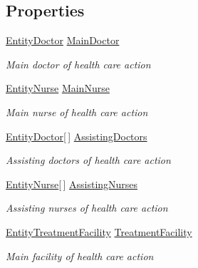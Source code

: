 \subsection*{Properties}
\begin{DoxyCompactItemize}
\item 
\hyperlink{class_general_health_care_elements_1_1_entities_1_1_entity_doctor}{Entity\+Doctor} \hyperlink{class_general_health_care_elements_1_1_resource_handling_1_1_resource_set_a867a08615f6caa7f2c7c96ef216a8098}{Main\+Doctor}
\begin{DoxyCompactList}\small\item\em Main doctor of health care action \end{DoxyCompactList}\item 
\hyperlink{class_general_health_care_elements_1_1_entities_1_1_entity_nurse}{Entity\+Nurse} \hyperlink{class_general_health_care_elements_1_1_resource_handling_1_1_resource_set_a6fbeb8cff94dcf758d47676b78e917dd}{Main\+Nurse}
\begin{DoxyCompactList}\small\item\em Main nurse of health care action \end{DoxyCompactList}\item 
\hyperlink{class_general_health_care_elements_1_1_entities_1_1_entity_doctor}{Entity\+Doctor}\mbox{[}$\,$\mbox{]} \hyperlink{class_general_health_care_elements_1_1_resource_handling_1_1_resource_set_a46b283bcac1e9081cd2e2f4a6672a4b9}{Assisting\+Doctors}
\begin{DoxyCompactList}\small\item\em Assisting doctors of health care action \end{DoxyCompactList}\item 
\hyperlink{class_general_health_care_elements_1_1_entities_1_1_entity_nurse}{Entity\+Nurse}\mbox{[}$\,$\mbox{]} \hyperlink{class_general_health_care_elements_1_1_resource_handling_1_1_resource_set_a54c029cc1ba4f1529750d19c1c36e7fb}{Assisting\+Nurses}
\begin{DoxyCompactList}\small\item\em Assisting nurses of health care action \end{DoxyCompactList}\item 
\hyperlink{class_general_health_care_elements_1_1_entities_1_1_entity_treatment_facility}{Entity\+Treatment\+Facility} \hyperlink{class_general_health_care_elements_1_1_resource_handling_1_1_resource_set_a3b0e82c6b530372dac28200b4b5230b8}{Treatment\+Facility}
\begin{DoxyCompactList}\small\item\em Main facility of health care action \end{DoxyCompactList}\end{DoxyCompactItemize}


